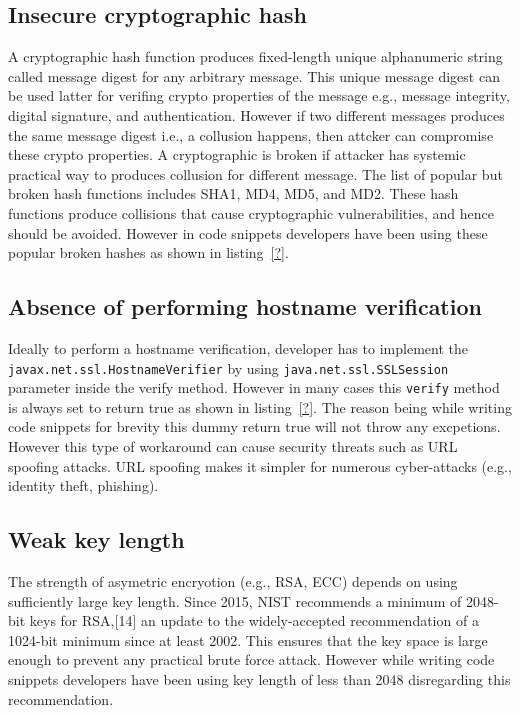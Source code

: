 \subsection{Insecure cryptographic hash}
A cryptographic hash function produces fixed-length unique alphanumeric string called message digest for any arbitrary message. This unique message digest can be used latter for verifing crypto properties of the message e.g., message integrity, digital signature, and authentication. However if two different messages produces the same message digest i.e., a collusion happens, then attcker can compromise these crypto properties. A cryptographic is broken if attacker has systemic practical way to produces collusion for different message. The list of popular but broken hash functions includes SHA1, MD4, MD5, and MD2. These hash functions produce collisions that cause cryptographic vulnerabilities, and hence should be avoided. However in code snippets developers have been using these popular broken hashes as shown in listing~\ref{?}. 


\subsection{Absence of performing hostname verification}


Ideally to perform a hostname verification, developer has to implement the \texttt{javax.net.ssl.HostnameVerifier} by using \texttt{java.net.ssl.SSLSession} parameter inside the verify method. However in many cases this \texttt{verify} method is always set to return true as shown in listing~\ref{?}. The reason being while writing code snippets for brevity this dummy return true will not throw any excpetions.  However this type of workaround can cause security threats such as URL spoofing attacks.  URL spoofing makes it simpler for numerous cyber-attacks (e.g., identity theft, phishing).

\subsection{Weak key length}
The strength of asymetric encryotion (e.g., RSA, ECC) depends on using sufficiently large key length. 
Since 2015, NIST recommends a minimum of 2048-bit keys for RSA,[14] an update to the widely-accepted recommendation of a 1024-bit minimum since at least 2002. This ensures that the key space is large enough to prevent any practical brute force attack.   
However while writing  code snippets developers have been using key length of less than 2048 disregarding this recommendation. 

